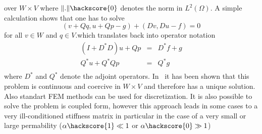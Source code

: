 over $W \times V$ where $\|.\|\hackscore{0}$ denotes the norm in $L^2(\Omega)$. A simple calculation shows that
one has to solve
\begin{equation}
( v + Qq , u + Qp - g) + (Dv,Du-f) =0 
\end{equation} 
for all $v\in W$ and $q \in V$.which translates back into operator notation
\begin{equation}
\begin{array}{rcl}
(I+D^*D)u + Qp & = & D^*f + g \\
Q^*u  + Q^*Q p & = & Q^*g \\ 
\end{array}
\end{equation} 
where $D^*$ and $Q^*$ denote the adjoint operators. 
In~\cite{LEASTSQUARESFEM1994} it has been shown that this problem is continuous and coercive in $W \times V$ and therefore has a unique solution. Also standart FEM methods can be used for discretization. It is also possible 
to solve the problem is coupled form, however this approach leads in some cases to a very ill-conditioned stiffness matrix in particular in the case of a very small or large permability ($\alpha\hackscore{1} \ll 1$ or $\alpha\hackscore{0} \gg 1$)  

